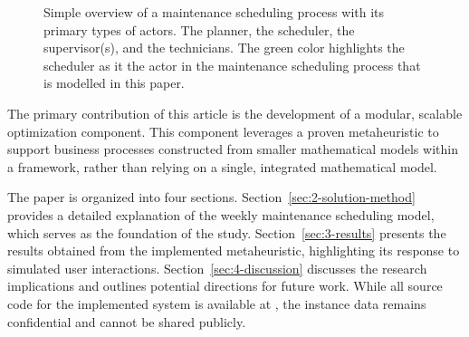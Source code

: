 \begin{figure}
	
	\caption{Simple overview of a maintenance scheduling process with its primary types of
		actors. The planner, the scheduler, the supervisor(s), and the technicians. 		
		The green color highlights the scheduler as it the actor in the maintenance
		scheduling process that is modelled in this paper.
	}\label{fig:integrated:maintenance-process}
\end{figure}

The primary contribution of this article is the development of a modular,
scalable optimization component. This component leverages a proven metaheuristic
to support business processes constructed from smaller mathematical models
within a framework, rather than relying on a single, integrated mathematical
model.

The paper is organized into four sections. Section~\ref{sec:2-solution-method}
provides a detailed explanation of the weekly maintenance scheduling model,
which serves as the foundation of the study. Section~\ref{sec:3-results}
presents the results obtained from the implemented metaheuristic, highlighting
its response to simulated user interactions. Section~\ref{sec:4-discussion}
discusses the research implications and outlines potential directions for
future work. While all source code for the implemented system is available at
\citep{scipo-code-ordinator_api}, the instance data remains confidential and
cannot be shared publicly.

